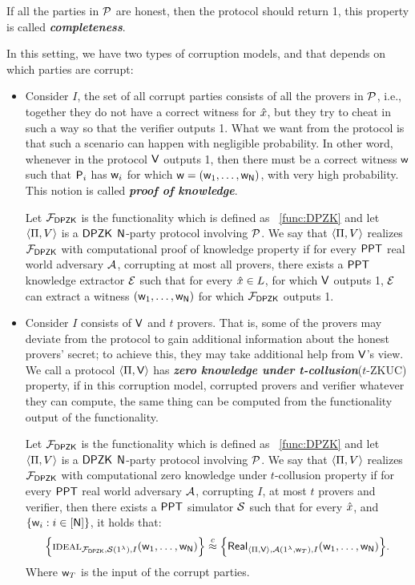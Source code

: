 If all the parties in $\mathcal{P}$ are honest, then the protocol should return 1, this property is called \textbf{\textit{completeness}}.

In this setting, we have two types of corruption models, and that depends on which parties are corrupt:
\begin{itemize} 
	\item Consider $I$, the set of all corrupt parties consists of all the provers in $\mathcal{P}$, i.e., together they do not have a correct witness for $\hat{x}$, but they try to cheat in such a way so that the verifier outputs 1. What we want from the protocol is that such a scenario can happen with negligible probability. In other word, whenever in the protocol $\mathsf{V}$ outputs 1, then there must be a correct witness $\mathsf{w}$ such that $\mathsf{P}_i$ has $\mathsf{w}_i$ for which $\mathsf{w} = (\mathsf{w}_1, \ldots, \mathsf{w}_{\mathsf{N}})$, with very high probability. This notion is called \textbf{\textit{proof of knowledge}}. 
	\begin{definition}
		Let $\mathcal{F}_{\mathsf{DPZK}}$ is the functionality which is defined as ~\ref{func:DPZK} and let $\langle \Pi,V\rangle$ is a $\mathsf{DPZK}$ $\mathsf{N}$-party protocol involving $\mathcal{P}$. We say that $\langle \Pi,V\rangle$ realizes $\mathcal{F}_{\mathsf{DPZK}}$ with computational proof of knowledge property if for every $\mathsf{PPT}$ real world adversary $\mathcal{A}$, corrupting at most all provers, there exists a $\mathsf{PPT}$ knowledge extractor $\mathcal{E}$ such that for every $\hat{x} \in L$, for which $\mathsf{V}$ outputs 1, $\mathcal{E}$ can extract a witness $(\mathsf{w}_1, \ldots, \mathsf{w}_{\mathsf{N}})$ for which $\mathcal{F}_{\mathsf{DPZK}}$ outputs 1.
	\end{definition}    
	
	\item Consider $I$ consists of $\mathsf{V}$ and $t$ provers. That is, some of the provers may deviate from the protocol to gain additional information about the honest provers' secret; to achieve this, they may take additional help from $\mathsf{V}$'s view. We call a protocol $\langle \Pi,\mathsf{V}\rangle$ has \textbf{\textit{zero knowledge under t-collusion}}($t$-ZKUC) property, if in this corruption model, corrupted provers and verifier whatever they can compute, the same thing can be computed from the functionality output of the functionality. 
	\begin{definition}
		Let $\mathcal{F}_{\mathsf{DPZK}}$ is the functionality which is defined as ~\ref{func:DPZK} and let $\langle \Pi,V\rangle$ is a $\mathsf{DPZK}$ $\mathsf{N}$-party protocol involving $\mathcal{P}$. We say that $\langle \Pi,V\rangle$ realizes $\mathcal{F}_{\mathsf{DPZK}}$ with computational zero knowledge under $t$-collusion property if for every $\mathsf{PPT}$ real world adversary $\mathcal{A}$, corrupting $I$, at most $t$ provers and verifier, then there exists a $\mathsf{PPT}$ simulator $\mathcal{S}$ such that for every $\hat{x}$, and $\{\mathsf{w}_i : i\in [\mathsf{N}]\}$, it holds that: 
		$$\Big\{\textsc{ideal}_{\mathcal{F}_{\mathsf{DPZK}}, \mathcal{S}(1^{\lambda}),I}(\mathsf{w}_1, \ldots, \mathsf{w}_{\mathsf{N}}) \Big\} \stackrel{c}{\approx} \Big\{ \mathsf{Real}_{\langle \Pi,\mathsf{V}\rangle, \mathcal{A}(1^{\lambda}, \mathsf{w}_T),I}(\mathsf{w}_1, \ldots, \mathsf{w}_{\mathsf{N}}) \Big\}. $$
		Where $\mathsf{w}_T$ is the input of the corrupt parties.
	\end{definition}
\end{itemize}

